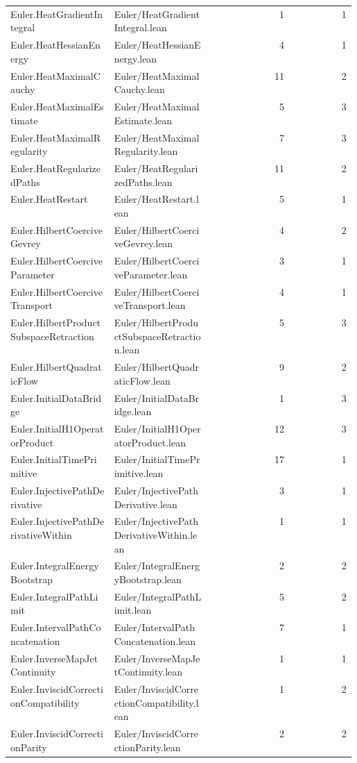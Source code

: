 \begin{longtable}{p{0.30\linewidth}p{0.28\linewidth}rr}
Euler.HeatGradientIntegral & Euler/HeatGradientIntegral.lean & 1 & 1\\
Euler.HeatHessianEnergy & Euler/HeatHessianEnergy.lean & 4 & 1\\
Euler.HeatMaximalCauchy & Euler/HeatMaximalCauchy.lean & 11 & 2\\
Euler.HeatMaximalEstimate & Euler/HeatMaximalEstimate.lean & 5 & 3\\
Euler.HeatMaximalRegularity & Euler/HeatMaximalRegularity.lean & 7 & 3\\
Euler.HeatRegularizedPaths & Euler/HeatRegularizedPaths.lean & 11 & 2\\
Euler.HeatRestart & Euler/HeatRestart.lean & 5 & 1\\
Euler.HilbertCoerciveGevrey & Euler/HilbertCoerciveGevrey.lean & 4 & 2\\
Euler.HilbertCoerciveParameter & Euler/HilbertCoerciveParameter.lean & 3 & 1\\
Euler.HilbertCoerciveTransport & Euler/HilbertCoerciveTransport.lean & 4 & 1\\
Euler.HilbertProductSubspaceRetraction & Euler/HilbertProductSubspaceRetraction.lean & 5 & 3\\
Euler.HilbertQuadraticFlow & Euler/HilbertQuadraticFlow.lean & 9 & 2\\
Euler.InitialDataBridge & Euler/InitialDataBridge.lean & 1 & 3\\
Euler.InitialH1OperatorProduct & Euler/InitialH1OperatorProduct.lean & 12 & 3\\
Euler.InitialTimePrimitive & Euler/InitialTimePrimitive.lean & 17 & 1\\
Euler.InjectivePathDerivative & Euler/InjectivePathDerivative.lean & 3 & 1\\
Euler.InjectivePathDerivativeWithin & Euler/InjectivePathDerivativeWithin.lean & 1 & 1\\
Euler.IntegralEnergyBootstrap & Euler/IntegralEnergyBootstrap.lean & 2 & 2\\
Euler.IntegralPathLimit & Euler/IntegralPathLimit.lean & 5 & 2\\
Euler.IntervalPathConcatenation & Euler/IntervalPathConcatenation.lean & 7 & 1\\
Euler.InverseMapJetContinuity & Euler/InverseMapJetContinuity.lean & 1 & 1\\
Euler.InviscidCorrectionCompatibility & Euler/InviscidCorrectionCompatibility.lean & 1 & 2\\
Euler.InviscidCorrectionParity & Euler/InviscidCorrectionParity.lean & 2 & 2\\

\end{longtable}

